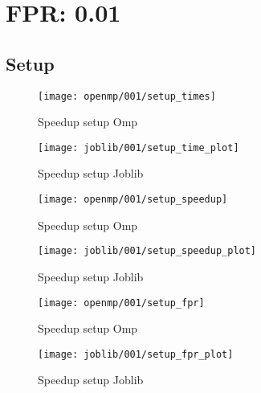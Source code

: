 \section{FPR: 0.01}\label{sec:fpr-001}
\subsection{Setup}\label{subsec:setup}
\begin{figure}[H]
    \centering
    \texttt{[image: openmp/001/setup\_times]}
        \caption{Speedup setup Omp}\label{fig:setup_time_omp}
    \endminipage\hfill
    \texttt{[image: joblib/001/setup\_time\_plot]}
        \caption{Speedup setup Joblib}\label{fig:setup_time_joblib}
    \endminipage\hfill
\end{figure}
\begin{figure}[H]
    \centering
    \texttt{[image: openmp/001/setup\_speedup]}
        \caption{Speedup setup Omp}\label{fig:setup_speedup_omp}
    \endminipage\hfill
    \texttt{[image: joblib/001/setup\_speedup\_plot]}
        \caption{Speedup setup Joblib}\label{fig:setup_speedup_joblib}
    \endminipage\hfill
\end{figure}
\begin{figure}[H]
    \centering
    \texttt{[image: openmp/001/setup\_fpr]}
        \caption{Speedup setup Omp}\label{fig:setup_fpr_omp}
    \endminipage\hfill
    \texttt{[image: joblib/001/setup\_fpr\_plot]}
        \caption{Speedup setup Joblib}\label{fig:setup_fpr_joblib}
    \endminipage\hfill
\end{figure}

